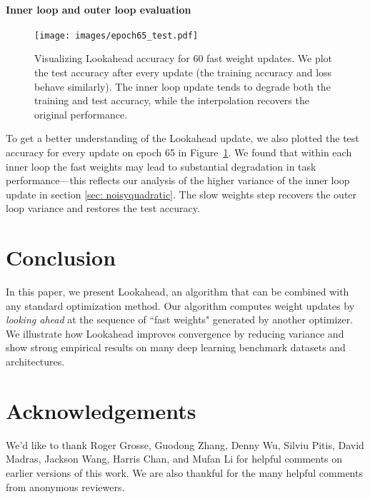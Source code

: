 \documentclass{article}
\begin{document}
\paragraph{Inner loop and outer loop evaluation}

\begin{figure}[t!]
    \centering
                            \texttt{[image: images/epoch65\_test.pdf]}
        \caption{Visualizing Lookahead accuracy for $60$ fast weight updates. We plot the test accuracy after every update (the training accuracy and loss behave similarly). The inner loop update tends to degrade both the training and test accuracy, while the interpolation recovers the original performance.}
        \label{fig:cifar-every-batch}
\end{figure}

To get a better understanding of the Lookahead update, we also plotted the test accuracy for every update on epoch 65 in Figure~\ref{fig:cifar-every-batch}. We found that within each inner loop the fast weights may lead to substantial degradation in task performance---this reflects our analysis of the higher variance of the inner loop update in section \ref{sec: noisyquadratic}. The slow weights step recovers the outer loop variance and restores the test accuracy.





  \section{Conclusion}
\label{sec:conclusion}

In this paper, we present Lookahead, an algorithm that can be combined with any standard optimization method. Our algorithm computes weight updates by \emph{looking ahead} at the sequence of ``fast weights" generated by another optimizer. We illustrate how Lookahead improves convergence by reducing variance and show strong empirical results on many deep learning benchmark datasets and architectures. 

\newpage



 \section*{Acknowledgements}

We'd like to thank Roger Grosse, Guodong Zhang, Denny Wu, Silviu Pitis, David Madras, Jackson Wang, Harris Chan, and Mufan Li for helpful comments on earlier versions of this work. We are also thankful for the many helpful comments from anonymous reviewers. 


\clearpage
\pagebreak
\end{document}
